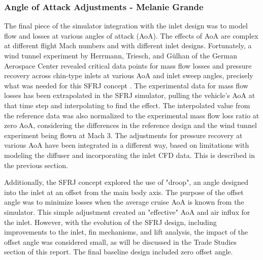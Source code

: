 \subsubsection{Angle of Attack Adjustments - Melanie Grande}
The final piece of the simulator integration with the inlet design was to model flow and losses at various angles of attack (AoA). The effects of AoA are complex at different flight Mach numbers and with different inlet designs. Fortunately, a wind tunnel experiment by Herrmann, Triesch, and G\"ulhan of the German Aerospace Center revealed critical data points for mass flow losses and pressure recovery across chin-type inlets at various AoA and inlet sweep angles, precisely what was needed for this SFRJ concept \cite{herrmann_2008}. The experimental data for mass flow losses has been extrapolated in the SFRJ simulator, pulling the vehicle's AoA at that time step and interpolating to find the effect. The interpolated value from the reference data was also normalized to the experimental mass flow loss ratio at zero AoA, considering the differences in the reference design and the wind tunnel experiment being flown at Mach 3. The adjustments for pressure recovery at various AoA have been integrated in a different way, based on limitations with modeling the diffuser and incorporating the inlet CFD data. This is described in the previous section. 

Additionally, the SFRJ concept explored the use of "droop", an angle designed into the inlet at an offset from the main body axis. The purpose of the offset angle was to minimize losses when the average cruise AoA is known from the simulator. This simple adjustment created an "effective" AoA and air influx for the inlet. However, with the evolution of the SFRJ design, including improvements to the inlet, fin mechanisms, and lift analysis, the impact of the offset angle was considered small, as will be discussed in the Trade Studies section of this report. The final baseline design included zero offset angle.
